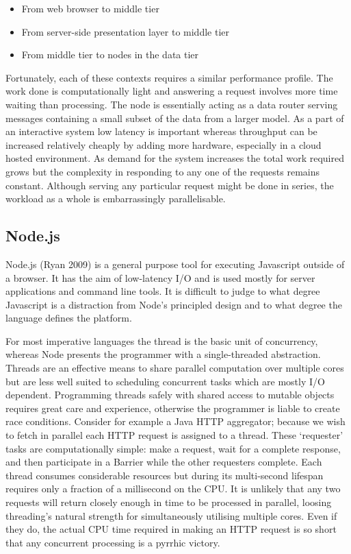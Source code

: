 \documentclass[12pt, ]{article}
\begin{document}
\begin{itemize}
\itemsep1pt\parskip0pt
\item
  From web browser to middle tier
\item
  From server-side presentation layer to middle tier
\item
  From middle tier to nodes in the data tier
\end{itemize}

Fortunately, each of these contexts requires a similar performance
profile. The work done is computationally light and answering a request
involves more time waiting than processing. The node is essentially
acting as a data router serving messages containing a small subset of
the data from a larger model. As a part of an interactive system low
latency is important whereas throughput can be increased relatively
cheaply by adding more hardware, especially in a cloud hosted
environment. As demand for the system increases the total work required
grows but the complexity in responding to any one of the requests
remains constant. Although serving any particular request might be done
in series, the workload as a whole is embarrassingly parallelisable.

\subsection{Node.js}\label{node.js}

Node.js (Ryan 2009) is a general purpose tool for executing Javascript
outside of a browser. It has the aim of low-latency I/O and is used
mostly for server applications and command line tools. It is difficult
to judge to what degree Javascript is a distraction from Node's
principled design and to what degree the language defines the platform.

For most imperative languages the thread is the basic unit of
concurrency, whereas Node presents the programmer with a single-threaded
abstraction. Threads are an effective means to share parallel
computation over multiple cores but are less well suited to scheduling
concurrent tasks which are mostly I/O dependent. Programming threads
safely with shared access to mutable objects requires great care and
experience, otherwise the programmer is liable to create race
conditions. Consider for example a Java HTTP aggregator; because we wish
to fetch in parallel each HTTP request is assigned to a thread. These
`requester' tasks are computationally simple: make a request, wait for a
complete response, and then participate in a Barrier while the other
requesters complete. Each thread consumes considerable resources but
during its multi-second lifespan requires only a fraction of a
millisecond on the CPU. It is unlikely that any two requests will return
closely enough in time to be processed in parallel, loosing threading's
natural strength for simultaneously utilising multiple cores. Even if
they do, the actual CPU time required in making an HTTP request is so
short that any concurrent processing is a pyrrhic victory.
\end{document}
